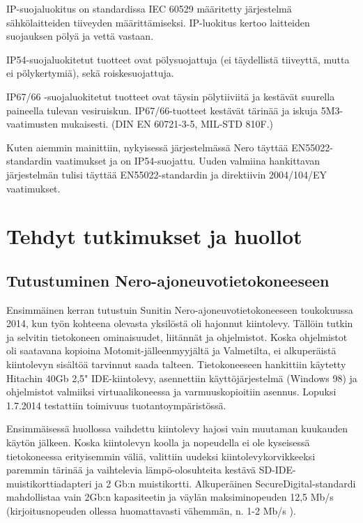 IP-suojaluokitus on standardissa IEC 60529 määritetty järjestelmä sähkölaitteiden tiiveyden määrittämiseksi. IP-luokitus kertoo laitteiden suojauksen pölyä ja vettä vastaan. \cite{IEC60529}

IP54-suojaluokitetut tuotteet ovat pölysuojattuja (ei täydellistä tiiveyttä, mutta ei pölykertymiä), sekä roiskesuojattuja.

IP67/66 -suojaluokitetut tuotteet ovat täysin pölytiiviitä ja kestävät suurella paineella tulevan vesiruiskun. IP67/66-tuotteet kestävät tärinää ja iskuja 5M3-vaatimusten mukaisesti. (DIN EN 60721-3-5, MIL-STD 810F.)

Kuten aiemmin mainittiin, nykyisessä järjestelmässä Nero täyttää EN55022-standardin vaatimukset ja on IP54-suojattu. Uuden valmiina hankittavan järjestelmän tulisi täyttää EN55022-standardin ja direktiivin  2004/104/EY vaatimukset.

\newpage
\chapter{Tehdyt tutkimukset ja huollot}

\section{Tutustuminen Nero-ajoneuvotietokoneeseen}

Ensimmäinen kerran tutustuin Sunitin Nero-ajoneuvotietokoneeseen toukokuussa 2014, kun työn kohteena olevasta yksilöstä oli hajonnut kiintolevy. Tällöin tutkin ja selvitin tietokoneen ominaisuudet, liitännät ja ohjelmistot. Koska ohjelmistot oli saatavana kopioina Motomit-jälleenmyyjältä ja Valmetilta, ei alkuperäistä kiintolevyn sisältöä tarvinnut saada talteen. Tietokoneeseen hankittiin käytetty Hitachin 40Gb 2,5" IDE-kiintolevy, asennettiin käyttöjärjestelmä (Windows 98) ja ohjelmistot valmiiksi virtuaalikoneessa ja varmuuskopioitiin asennus. Lopuksi 1.7.2014 testattiin toimivuus tuotantoympäristössä.

Ensimmäisessä huollossa vaihdettu kiintolevy hajosi vain muutaman kuukauden käytön jälkeen. Koska kiintolevyn koolla ja nopeudella ei ole kyseisessä tietokoneessa erityisemmin väliä, valittiin uudeksi kiintolevykorvikkeeksi paremmin tärinää ja vaihtelevia lämpö-olosuhteita kestävä SD-IDE-muistikorttiadapteri ja 2 Gb:n muistikortti. Alkuperäinen SecureDigital-standardi mahdollistaa vain 2Gb:n kapasiteetin ja väylän maksiminopeuden 12,5 Mb/s (kirjoitusnopeuden ollessa huomattavasti vähemmän, n. 1-2 Mb/s )\cite{sd:2gb}.

